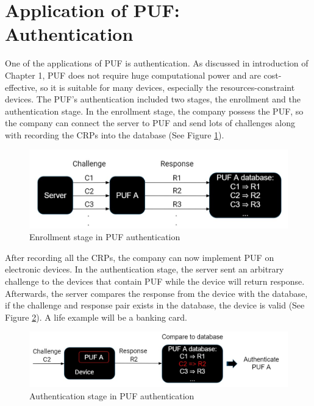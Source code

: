 \section{Application of PUF: Authentication}
One of the applications of PUF is authentication. As discussed in introduction of Chapter 1, PUF does not require huge computational power and are cost-effective, so it is suitable for many devices,
especially the resources-constraint devices. The PUF's authentication included two stages, the enrollment and the authentication stage. In the enrollment stage, the company possess the PUF, so
the company can connect the server to PUF and send lots of challenges along with recording the CRPs into the database \cite{Reference2} (See Figure \ref{fig:figure4}).

\begin{figure}[htp]
    \centering
    \includegraphics[width=14cm]{figures/figure4.jpg}
    \caption{Enrollment stage in PUF authentication}
    \label{fig:figure4}
    \end{figure}

After recording all the CRPs, the company can now implement PUF on electronic devices.
In the authentication stage, the server sent an arbitrary challenge to the devices that contain PUF while the device will return response. Afterwards, the server compares the response from the device with the database, 
if the challenge and response pair exists in the database, the device is valid \cite{Reference2} (See Figure \ref{fig:figure5}). A life example will be a banking card.

\begin{figure}[htp]
    \centering
    \includegraphics[width=14cm]{figures/figure5.jpg}
    \caption{Authentication stage in PUF authentication}
    \label{fig:figure5}
    \end{figure}

